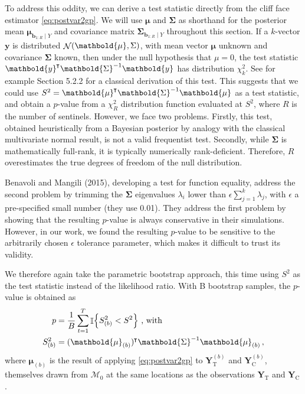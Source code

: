 \documentclass[letter]{article}
\DeclarePairedDelimiter{\parenthesis}{\lparen}{\rparen}
\DeclarePairedDelimiter{\curlybracket}{\lbrace}{\rbrace}
\newcommand{\del}[1]{\parenthesis*{#1}}
\newcommand{\cbr}[1]{\curlybracket*{#1}}
\DeclareMathOperator{\Ind}{\mathbb{I}}
\DeclareMathOperator{\normal}{\mathcal{N}}
\newcommand*{\trans}{^{\mkern-1.5mu\intercal}}
\newcommand{\treat}{\mathrm{T}}
\newcommand{\ctrol}{\mathrm{C}}
\newcommand{\yvec}{\mathbold{y}}
\newcommand{\Yvec}{\mathbold{Y}}
\newcommand{\yt}{\Yvec_{\treat}}
\newcommand{\yc}{\Yvec_{\ctrol}}
\newcommand{\muvec}{\mathbold{\mu}}
\newcommand{\sentinel}{\bm{b}}
\newcommand{\numsent}{R}
\newcommand{\sentinels}{\sentinel_{1:\numsent}}
\newcommand{\modnull}{\mathscr{M}_0}
\newcommand{\SigmaMat}{\mathbold{\Sigma}}
\renewcommand{\cite}[1]{\citet{#1}}
\begin{document}
To address this oddity, we can derive a test statistic directly from the cliff face estimator \eqref{eq:postvar2gp}.
We will use \(\muvec\) and \(\SigmaMat\) as shorthand for the posterior mean \(\muvec_{\sentinels \mid Y}\)
and covariance matrix \(\SigmaMat_{\sentinels \mid Y}\) throughout this section.
If a \(k\)-vector \(\yvec\) is distributed \(\normal\del{\muvec, \Sigma}\), with mean vector \(\muvec\) unknown and covariance \(\SigmaMat\) known, then under the null hypothesis that \(\mu=0\), the test statistic \(\yvec\trans \SigmaMat^{-1} \yvec\) has distribution \(\chi^2_k\).
See for example \cite{rencher2003methods} Section 5.2.2 for a classical derivation of this test.
This suggests that we could use \(S^2=\muvec\trans \SigmaMat^{-1} \muvec\) as a test statistic,
and obtain a \(p\)-value from a \(\chi^2_\numsent\) distribution function evaluated at \(S^2\), where \(\numsent\) is the number of sentinels.
However, we face two problems.
Firstly, this test, obtained heuristically from a Bayesian posterior by analogy with the classical multivariate normal result, is not a valid frequentist test.
Secondly, while \(\SigmaMat\) is mathematically full-rank, it is typically numerically rank-deficient.
Therefore, \(\numsent\) overestimates the true degrees of freedom of the null distribution.

Benavoli and Mangili (2015), developing a test for function equality, address the second problem by trimming the \(\SigmaMat\) eigenvalues \(\lambda_i\) lower than \(\epsilon \sum_{j=1}^k \lambda_j\), with \(\epsilon\) a pre-specified small number (they use 0.01).
They address the first problem by showing that the resulting \(p\)-value is always conservative in their simulations.
However, in our work, we found the resulting \(p\)-value to be sensitive to the arbitrarily chosen \(\epsilon\) tolerance parameter, which makes it difficult to trust its validity.

We therefore again take the parametric bootstrap approach, this time using \(S^2\) as the test statistic instead of the likelihood ratio.
With B bootstrap samples, the \(p\)-value is obtained as
\begin{equation}
\begin{split}
    p &= \frac{1}{B} \sum_{t=1}^T \Ind\cbr{S_{(b)}^2 < S^2}\  \text{, with}\\
    S_{(b)}^2 &= (\muvec_{(b)} )\trans \SigmaMat^{-1} \muvec_{(b)}\,,
\end{split}
\end{equation}
where \(\muvec_{(b)}\) is the result of applying \eqref{eq:postvar2gp} to \(\yt^{(b)}\) and \(\yc^{(b)}\), themselves drawn from \(\modnull\) at the same locations as the observations \(\yt\) and \(\yc\).
\end{document}
